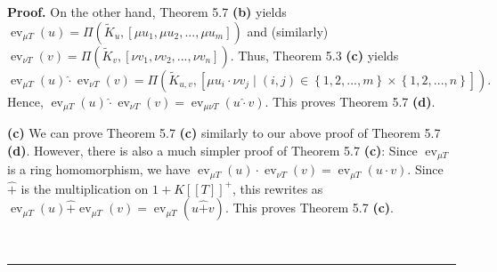 \documentclass[numbers=enddot,12pt,final,onecolumn,notitlepage]{scrartcl}%
\newenvironment{proof}[1][Proof]{\noindent\textbf{#1.} }{\ \rule{0.5em}{0.5em}}
\begin{document}
\begin{proof}
On the other hand, Theorem 5.7 \textbf{(b)} yields $\operatorname*{ev}_{\mu
T}\left(  u\right)  =\Pi\left(  \widetilde{K}_{u},\left[  \mu u_{1},\mu
u_{2},...,\mu u_{m}\right]  \right)  $ and (similarly) $\operatorname*{ev}%
_{\nu T}\left(  v\right)  =\Pi\left(  \widetilde{K}_{v},\left[  \nu v_{1},\nu
v_{2},...,\nu v_{n}\right]  \right)  $. Thus, Theorem 5.3 \textbf{(c)} yields%
\[
\operatorname*{ev}\nolimits_{\mu T}\left(  u\right)  \widehat{\cdot
}\operatorname*{ev}\nolimits_{\nu T}\left(  v\right)  =\Pi\left(
\widetilde{K}_{u,v},\left[  \mu u_{i}\cdot\nu v_{j}\mid\left(  i,j\right)
\in\left\{  1,2,...,m\right\}  \times\left\{  1,2,...,n\right\}  \right]
\right)  .
\]
Hence, $\operatorname*{ev}_{\mu T}\left(  u\right)  \widehat{\cdot
}\operatorname*{ev}_{\nu T}\left(  v\right)  =\operatorname*{ev}_{\mu\nu
T}\left(  u\widehat{\cdot}v\right)  $. This proves Theorem 5.7 \textbf{(d)}.

\textbf{(c)} We can prove Theorem 5.7 \textbf{(c)} similarly to our above
proof of Theorem 5.7 \textbf{(d)}. However, there is also a much simpler proof
of Theorem 5.7 \textbf{(c)}: Since $\operatorname*{ev}\nolimits_{\mu T}$ is a
ring homomorphism, we have $\operatorname*{ev}\nolimits_{\mu T}\left(
u\right)  \cdot\operatorname*{ev}\nolimits_{\nu T}\left(  v\right)
=\operatorname*{ev}\nolimits_{\mu T}\left(  u\cdot v\right)  $. Since
$\widehat{+}$ is the multiplication on $1+K\left[  \left[  T\right]  \right]
^{+}$, this rewrites as $\operatorname*{ev}_{\mu T}\left(  u\right)
\widehat{+}\operatorname*{ev}_{\mu T}\left(  v\right)  =\operatorname*{ev}%
_{\mu T}\left(  u\widehat{+}v\right)  $. This proves Theorem 5.7 \textbf{(c)}.


\end{proof}
\end{document}

